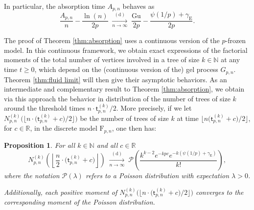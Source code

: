 \documentclass[a4, 11pt]{article}
\numberwithin{equation}{section}
\theoremstyle{plain}
\newtheorem{proposition}[theorem]{Proposition}
\theoremstyle{definition}
\theoremstyle{remark}
\begin{document}
\bigskip

In particular, the absorption time $A_{p,n}$ behaves as
$$
\frac{A_{p,n}}{n} - \frac{\ln(n)}{2p}  \; \underset{n \rightarrow \infty}{\overset{(\mathrm d)}\longrightarrow} \; \frac{\mathrm{Gu}}{2p}-\frac{\psi(1/p)+\gamma_{\mathrm E}}{2p}.
$$

The proof of Theorem \ref{thm:absorption} uses a continuous version of the $p$-frozen model. In this continuous framework, we obtain exact expressions of the factorial moments of the total number of vertices involved in a tree of size $k \in \mathbb N$ at any time $t \geq 0$, which depend on the (continuous version of the) gel process $G_{p,n}$. Theorem \ref{thm:fluid limit} will then give their asymptotic behaviors. As an intermediate and complementary result to Theorem \ref{thm:absorption}, we obtain via this approach the behavior in distribution of the number of trees of size $k$ around the threshold times $n \cdot \mathsf t^{(k)}_{p,n}/2$. More precisely, if we let $N_{p,n}^{(k)}\big(\big \lfloor n \cdot \big(\mathsf t^{(k)}_{p,n}+c\big) /2\big \rfloor \big)$ be the number of trees of size $k$ at time $\big \lfloor n \big(\mathsf t^{(k)}_{p,n}+c\big)/2\big \rfloor $, for $c \in \mathbb R$, in the discrete model $\mathrm{F}_{p,n}$, one then has:

\medskip

\begin{proposition}
\label{prop:arbreskdiscrets}
For all $k \in \mathbb N$ and all $c \in \mathbb R$
$$
N_{p,n}^{(k)}\left(\left \lfloor \frac{n}{2} \cdot \big(\mathsf t^{(k)}_{p,n}+c\big) \right \rfloor \right) \; \underset{n \rightarrow \infty}{\overset{(\mathrm d)}\longrightarrow} \; \mathcal P\left(\frac{k^{k-2}e^{-kpc} e^{-k\left(\psi(1/p)+\gamma_{\mathrm E}\right)}}{k!} \right),
$$
where  the notation $\mathcal P(\lambda)$ refers to a Poisson distribution with expectation $\lambda>0$.

Additionally, each positive moment of $N_{p,n}^{(k)}\big(\big \lfloor n \cdot \big(\mathsf t^{(k)}_{p,n}+c\big) /2\big \rfloor \big)$ converges to the corresponding moment of the Poisson distribution.
\end{proposition}
\end{document}
